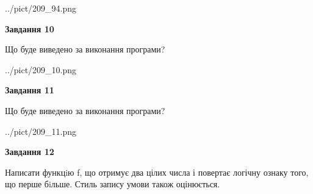 \documentclass[12pt, ukrainian]{article}
\begin{document}
{\begin {large}
\begin{center}
	{../pict/209_94.png}
\end{center}
\newpage

{\begin {center}\textbf{Завдання 10}\end {center}}

Що буде виведено за виконання програми?\par
\begin{center}
	{../pict/209_10.png}
\end{center}
\newpage

{\begin {center}\textbf{Завдання 11}\end {center}}

Що буде виведено за виконання програми?\par
\begin{center}
	{../pict/209_11.png}
\end{center}
\newpage

{\begin {center}\textbf{Завдання 12}\end {center}}


Написати функцiю f, що отримує два цілих числа і повертає логічну ознаку того, що перше бiльше. Стиль запису умови також оцінюється.\par
\newpage

\end {large}}
\end{document}
